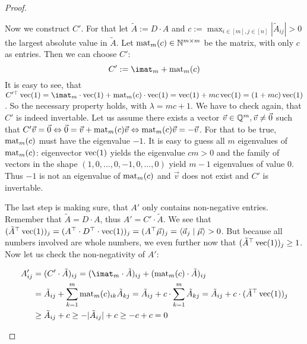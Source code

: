 \begin{proof}
\begin{enumerate}
        Now we construct $C'$. For that let $\tilde A := D \cdot A$ and $c := \max_{i \in [m], j\in[n]} |\tilde A_{ij}| > 0$ the largest absolute value in $\tilde A$. Let $\operatorname{mat}_m(c) \in \mathbb{N}^{m\times m}$ be the matrix, with only $c$ as entries. Then we can choose $C'$:
        $$C' := \imat_m + \opmat_m(c)$$
        It is easy to see, that $C'^\top \opvec(1) = \imat_m\cdot \opvec(1) + \opmat_m(c)\cdot \opvec(1) = \opvec(1) + mc \opvec(1) = (1 + mc)\opvec(1)$. So the necessary property holds, with $\lambda = mc+1$. We have to check again, that $C'$ is indeed invertable. Let us assume there exists a vector $\vec v \in \mathbb{Q}^m, \vec v \neq \vec0$ such that $C'\vec v = \vec 0 \Leftrightarrow \vec0 = \vec v + \operatorname{mat}_m(c)\vec v \Leftrightarrow \operatorname{mat}_m(c)\vec v = -\vec v$. For that to be true, $\operatorname{mat}_m(c)$ must have the eigenvalue $-1$. It is easy to guess all $m$ eigenvalues of $\operatorname{mat}_m(c)$: eigenvector $\operatorname{vec}(1)$ yields the eigenvalue $cm>0$ and the family of vectors in the shape $(1, 0, \dots, 0, -1, 0, \dots, 0)$ yield $m-1$ eigenvalues of value $0$. Thus $-1$ is not an eigenvalue of $\operatorname{mat}_m(c)$ and $\vec v$ does not exist and $C'$ is invertable.

        The last step is making sure, that $A'$ only contains non-negative entries. Remember that $\tilde A = D \cdot A$, thus $A' = C' \cdot \tilde A$. We see that $(\tilde A^\top \operatorname{vec}(1))_j =(A^\top\cdot D^\top\cdot \operatorname{vec}(1))_j = (A^\top \vec\mu)_j = \langle \vec a_j \mid \vec\mu \rangle > 0$. But because all numbers involved are whole numbers, we even further now that $(\tilde A^\top \operatorname{vec}(1))_j \geq 1$. Now let us check the non-negativity of $A'$:

        \begin{align*}
            A'_{ij} &= (C'\cdot \tilde A)_{ij} = (\imat_m \cdot \tilde A)_{ij} + (\opmat_m(c)\cdot \tilde A)_{ij}\\
            &= \tilde A_{ij} + \sum_{k=1}^{m}\opmat_m(c)_{ik} \tilde A_{kj} = \tilde A_{ij} + c \cdot \sum_{k=1}^{m} \tilde A_{kj} = \tilde A_{ij} + c \cdot (\tilde A^\top \opvec(1))_j\\
            &\geq \tilde A_{ij} + c \geq - |\tilde A_{ij}| + c \geq - c + c = 0
        \end{align*}
        

\end{enumerate}
\end{proof}
